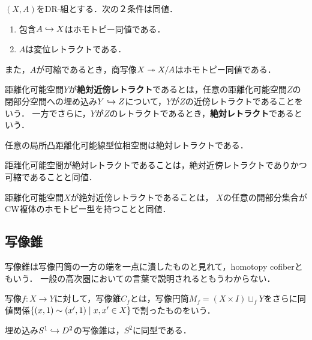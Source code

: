 \documentclass[uplatex,dvipdfmx]{jsreport}
\begin{document}
\begin{lemma}
    $(X,A)$をDR-組とする．次の２条件は同値．
    \begin{enumerate}
        \item 包含$A\hookrightarrow X$はホモトピー同値である．
        \item $A$は変位レトラクトである．
    \end{enumerate}
    また，$A$が可縮であるとき，商写像$X\twoheadrightarrow X/A$はホモトピー同値である．
\end{lemma}

\begin{definition}
    距離化可能空間$Y$が\textbf{絶対近傍レトラクト}であるとは，任意の距離化可能空間$Z$の閉部分空間への埋め込み$Y\hookrightarrow Z$について，$Y$が$Z$の近傍レトラクトであることをいう．
    一方でさらに，$Y$が$Z$のレトラクトであるとき，\textbf{絶対レトラクト}であるという．
\end{definition}

\begin{example}
    任意の局所凸距離化可能線型位相空間は絶対レトラクトである．
\end{example}

\begin{lemma}
    距離化可能空間が絶対レトラクトであることは，絶対近傍レトラクトでありかつ可縮であることと同値．
\end{lemma}

\begin{theorem}[Cauty]
    距離化可能空間$X$が絶対近傍レトラクトであることは，
    $X$の任意の開部分集合がCW複体のホモトピー型を持つことと同値．
\end{theorem}

\subsection{写像錐}

\begin{tcolorbox}[colframe=ForestGreen, colback=ForestGreen!10!white,breakable,colbacktitle=ForestGreen!40!white,coltitle=black,fonttitle=\bfseries\sffamily,
title=]
    写像錐は写像円筒の一方の端を一点に潰したものと見れて，homotopy cofiberともいう．
    一般の高次圏においての言葉で説明されるともうわからない．
\end{tcolorbox}

\begin{definition}
    写像$f:X\to Y$に対して，写像錐$C_f$とは，写像円筒$M_f=(X\times I)\sqcup_fY$をさらに同値関係$\left\{(x,1)\sim(x',1)\mid x,x'\in X\right\}$で割ったものをいう．
\end{definition}
\begin{example}
    埋め込み$S^1\hookrightarrow D^2$の写像錐は，$S^2$に同型である．
\end{example}
\end{document}
